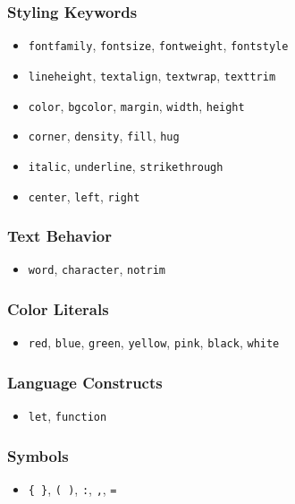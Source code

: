 \documentclass{article}
\begin{document}
\subsubsection*{Styling Keywords}
\begin{itemize}
    \item \texttt{fontfamily}, \texttt{fontsize}, \texttt{fontweight}, \texttt{fontstyle}
    \item \texttt{lineheight}, \texttt{textalign}, \texttt{textwrap}, \texttt{texttrim}
    \item \texttt{color}, \texttt{bgcolor}, \texttt{margin}, \texttt{width}, \texttt{height}
    \item \texttt{corner}, \texttt{density}, \texttt{fill}, \texttt{hug}
    \item \texttt{italic}, \texttt{underline}, \texttt{strikethrough}
    \item \texttt{center}, \texttt{left}, \texttt{right}
\end{itemize}

\subsubsection*{Text Behavior}
\begin{itemize}
    \item \texttt{word}, \texttt{character}, \texttt{notrim}
\end{itemize}

\subsubsection*{Color Literals}
\begin{itemize}
    \item \texttt{red}, \texttt{blue}, \texttt{green}, \texttt{yellow}, \texttt{pink}, \texttt{black}, \texttt{white}
\end{itemize}

\subsubsection*{Language Constructs}
\begin{itemize}
    \item \texttt{let}, \texttt{function}
\end{itemize}

\subsubsection*{Symbols}
\begin{itemize}
    \item \texttt{\{ \}}, \texttt{( )}, \texttt{:}, \texttt{,}, \texttt{=}
\end{itemize}
\end{document}

